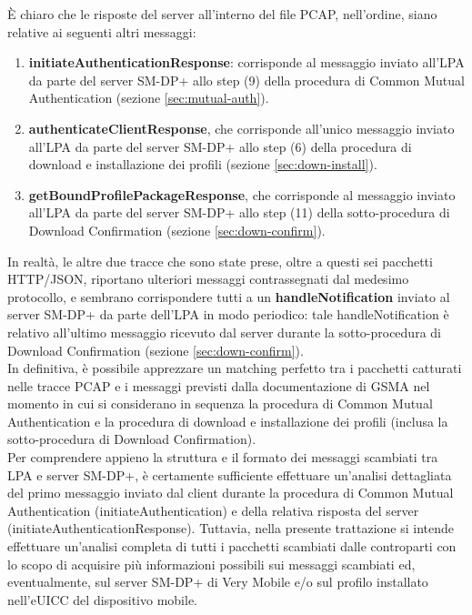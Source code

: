 \documentclass[10pt, oneside]{book}
\begin{document}
È chiaro che le risposte del server all'interno del file PCAP, nell'ordine, siano relative ai seguenti altri messaggi:
\begin{enumerate}
\item \textbf{initiateAuthenticationResponse}: corrisponde al messaggio inviato all'LPA da parte del server SM-DP+ allo step (9) della procedura di Common Mutual Authentication (sezione \ref{sec:mutual-auth}).
\item \textbf{authenticateClientResponse}, che corrisponde all'unico messaggio inviato all'LPA da parte del server SM-DP+ allo step (6) della procedura di download e installazione dei profili (sezione \ref{sec:down-install}).
\item \textbf{getBoundProfilePackageResponse}, che corrisponde al messaggio inviato all'LPA da parte del server SM-DP+ allo step (11) della sotto-procedura di Download Confirmation (sezione \ref{sec:down-confirm}).
\end{enumerate}
In realtà, le altre due tracce che sono state prese, oltre a questi sei pacchetti HTTP/JSON, riportano ulteriori messaggi contrassegnati dal medesimo protocollo, e sembrano corrispondere tutti a un \textbf{handleNotification} inviato al server SM-DP+ da parte dell'LPA in modo periodico: tale handleNotification è relativo all'ultimo messaggio ricevuto dal server durante la sotto-procedura di Download Confirmation (sezione \ref{sec:down-confirm}).\\
In definitiva, è possibile apprezzare un matching perfetto tra i pacchetti catturati nelle tracce PCAP e i messaggi previsti dalla documentazione di GSMA \cite{GSMA-docs-new} nel momento in cui si considerano in sequenza la procedura di Common Mutual Authentication e la procedura di download e installazione dei profili (inclusa la sotto-procedura di Download Confirmation).\\
Per comprendere appieno la struttura e il formato dei messaggi scambiati tra LPA e server SM-DP+, è certamente sufficiente effettuare un'analisi dettagliata del primo messaggio inviato dal client durante la procedura di Common Mutual Authentication (initiateAuthentication) e della relativa risposta del server (initiateAuthenticationResponse). Tuttavia, nella presente trattazione si intende effettuare un'analisi completa di tutti i pacchetti scambiati dalle controparti con lo scopo di acquisire più informazioni possibili sui messaggi scambiati ed, eventualmente, sul server SM-DP+ di Very Mobile e/o sul profilo installato nell'eUICC del dispositivo mobile.
\end{document}
